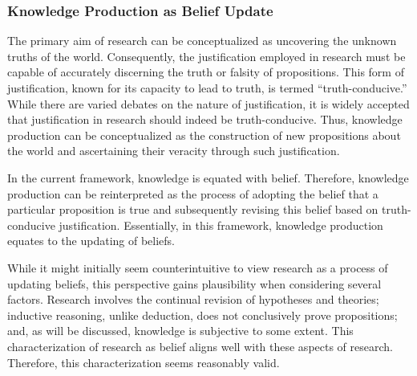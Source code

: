 \subsubsection{Knowledge Production as Belief Update}
The primary aim of research can be conceptualized as uncovering the unknown truths of the world. Consequently, the justification employed in research must be capable of accurately discerning the truth or falsity of propositions. This form of justification, known for its capacity to lead to truth, is termed ``truth-conducive.'' While there are varied debates on the nature of justification, it is widely accepted that justification in research should indeed be truth-conducive. Thus, knowledge production can be conceptualized as the construction of new propositions about the world and ascertaining their veracity through such justification.

In the current framework, knowledge is equated with belief. Therefore, knowledge production can be reinterpreted as the process of adopting the belief that a particular proposition is true and subsequently revising this belief based on truth-conducive justification. Essentially, in this framework, knowledge production equates to the updating of beliefs.

While it might initially seem counterintuitive to view research as a process of updating beliefs, this perspective gains plausibility when considering several factors. Research involves the continual revision of hypotheses and theories; inductive reasoning, unlike deduction, does not conclusively prove propositions; and, as will be discussed, knowledge is subjective to some extent. This characterization of research as belief aligns well with these aspects of research. Therefore, this characterization seems reasonably valid.



